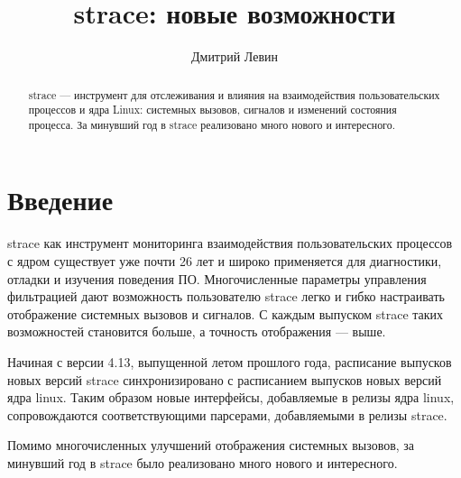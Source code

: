 
\author{Дмитрий Левин}
\title{strace: новые возможности}

\maketitle

\begin{abstract}
strace --- инструмент для отслеживания и влияния на взаимодействия
пользовательских процессов и ядра Linux: системных вызовов, сигналов
и изменений состояния процесса.  За минувший год в strace реализовано
много нового и интересного.
\end{abstract}

\section{Введение}

strace как инструмент мониторинга взаимодействия пользовательских процессов с
ядром существует уже почти 26 лет и широко применяется для диагностики, отладки
и изучения поведения ПО.  Многочисленные параметры управления фильтрацией дают
возможность пользователю strace легко и гибко настраивать отображение системных
вызовов и сигналов.  С каждым выпуском strace таких возможностей становится
больше, а точность отображения --- выше.

Начиная с версии 4.13, выпущенной летом прошлого года, расписание выпусков
новых версий strace синхронизировано с расписанием выпусков новых версий ядра
linux.  Таким образом новые интерфейсы, добавляемые в релизы ядра linux,
сопровождаются соответствующими парсерами, добавляемыми в релизы strace.

Помимо многочисленных улучшений отображения системных вызовов, за минувший год
в strace было реализовано много нового и интересного.

